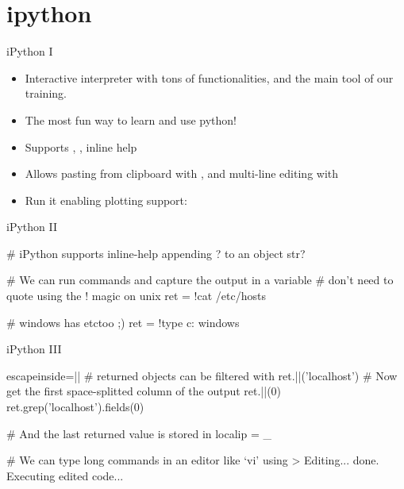 \section{ipython}



\begin{pyframe}{iPython I}
\begin{itemize}
\item Interactive interpreter with tons of                                                                                                        functionalities, and the main tool of our training.
\item   The most fun way to learn and use python!

\item   Supports , , inline help

\item   Allows pasting from clipboard with  ,
    and multi-line editing with 

\item   Run it enabling plotting support: \\
\end{itemize}

\end{pyframe}


\begin{pyframe}{iPython II}
\begin{pycode}
# iPython supports inline-help appending ? to an object
str?

# We can run commands and capture the output in a variable
# don't need to quote using the ! magic on unix
ret = !cat /etc/hosts

# windows has etc\hosts too ;)
ret = !type c: windows\drivers\etc\hosts
\end{pycode}
\end{pyframe}


\begin{pyframe}{iPython III}
\begin{pycode*}{escapeinside=||}
# returned objects can be filtered with
ret.||('localhost')
# Now get the first space-splitted column of the output
ret.||(0)
ret.grep('localhost').fields(0)

# And the last returned value is stored in
localip = _

# We can type long commands in an editor like `vi' using
> Editing... done. Executing edited code...

\end{pycode*}
\end{pyframe}
